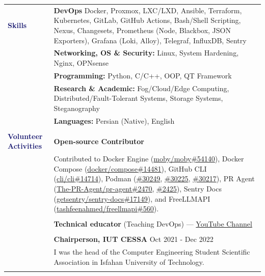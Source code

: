 \documentclass[letterpaper, 11pt]{article}
\begin{document}
\begin{longtable}{p{1.7in}p{5.1in}}
{\textcolor{MidnightBlue}{\textbf{\fontsize{12.6pt}{15pt}\selectfont Skills}}} 
& \textbf{DevOps} Docker, Proxmox, LXC/LXD, Ansible, Terraform, Kubernetes, GitLab, GitHub Actions, Bash/Shell Scripting, Nexus, Changesets, Prometheus (Node, Blackbox, JSON Exporters), Grafana (Loki, Alloy), Telegraf, InfluxDB, Sentry \\
& \textbf{Networking, OS \& Security:} Linux, System Hardening, Nginx, OPNsense \\
& \textbf{Programming:} Python, C/C++, OOP, QT Framework\\
& \textbf{Research \& Academic:} Fog/Cloud/Edge Computing, Distributed/Fault-Tolerant Systems, Storage Systems, Steganography \\
& \textbf{Languages:} Persian (Native), English \\
& \\


\textcolor{MidnightBlue}{\textbf{\fontsize{12.6pt}{15pt}\selectfont Volunteer Activities}}
& \textbf{Open-source Contributor} \\
& Contributed to Docker Engine (\href{https://github.com/moby/moby/pull/54140}{moby/moby\#54140}), Docker Compose (\href{https://github.com/docker/compose/pull/14481}{docker/compose\#14481}), GitHub CLI (\href{https://github.com/cli/cli/pull/14714}{cli/cli\#14714}), Podman (\href{https://github.com/podman-container-tools/podman/pull/30249}{\#30249}, \href{https://github.com/podman-container-tools/podman/pull/30225}{\#30225}, \href{https://github.com/podman-container-tools/podman/pull/30217}{\#30217}), PR Agent (\href{https://github.com/The-PR-Agent/pr-agent/pull/2470}{The-PR-Agent/pr-agent\#2470}, \href{https://github.com/The-PR-Agent/pr-agent/pull/2425}{\#2425}), Sentry Docs (\href{https://github.com/getsentry/sentry-docs/pull/17149}{getsentry/sentry-docs\#17149}), and FreeLLMAPI (\href{https://github.com/tashfeenahmed/freellmapi/pull/560}{tashfeenahmed/freellmapi\#560}). \\
& \\
& \textbf{Technical educator} (Teaching DevOps) — \href{https://www.youtube.com/@Amir.Arsalan.Yavari}{YouTube Channel} \\
& \\
& \textbf{Chairperson, IUT CESSA} \hfill Oct 2021 - Dec 2022 \\
& I was the head of the Computer Engineering Student Scientific Association in Isfahan University of Technology. \\
& \\


\end{longtable}
\end{document}
